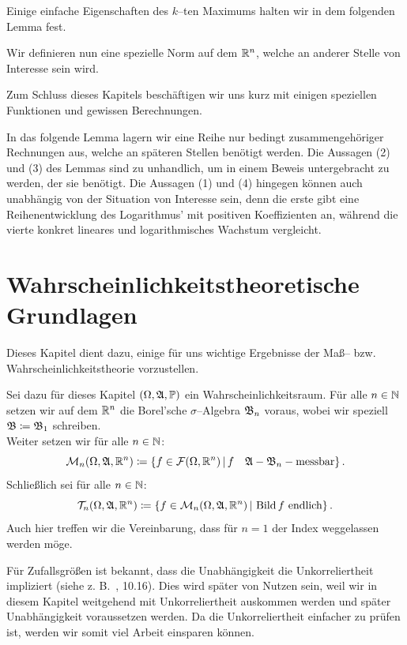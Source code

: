 \documentclass[a4paper]{report}
\numberwithin[\roman]{equation}{sat}
\begin{document}

\parag
Einige einfache Eigenschaften des $k$--ten Maximums halten wir in dem folgenden
Lemma fest.


\parag
Wir definieren nun eine spezielle Norm auf dem $\mathbb{R}^n$, welche an anderer Stelle
von Interesse sein wird.


\parag
Zum Schluss dieses Kapitels beschäftigen wir uns kurz mit einigen speziellen
Funktionen und gewissen Berechnungen.




\parag
In das folgende Lemma lagern wir eine Reihe nur bedingt zusammengehöriger
Rechnungen aus, welche an späteren Stellen benötigt werden. Die Aussagen (2)
und (3) des Lemmas sind zu unhandlich, um in einem Beweis untergebracht zu
werden, der sie benötigt. Die Aussagen (1) und (4) hingegen können auch
unabhängig von der Situation von Interesse sein, denn die erste gibt eine
Reihenentwicklung des Logarithmus' mit positiven Koeffizienten an, während die
vierte konkret lineares und logarithmisches Wachstum vergleicht.



\chapter{Wahrscheinlichkeitstheoretische Grundlagen}
\label{ch:kapitel2}

Dieses Kapitel dient dazu, einige für uns wichtige Ergebnisse der Maß-- bzw.
Wahrscheinlichkeitstheorie vorzustellen.

Sei dazu für dieses Kapitel $(\Omega, \mathfrak{A}, \mathbb{P})$
ein Wahrscheinlichkeitsraum. Für alle $n \in \mathbb{N}$ setzen wir auf dem $\mathbb{R}^n$
die Borel'sche $\sigma$--Algebra $\mathfrak{B}_n$ voraus, wobei wir speziell
$\mathfrak{B} \coloneqq  \mathfrak{B}_1$ schreiben.\\
Weiter setzen wir für alle $n \in \mathbb{N}$:
\[\mathcal{M}_n(\Omega, \mathfrak{A}, \mathbb{R}^n)
 \coloneqq \left\{f\in\mathcal{F}(\Omega,\mathbb{R}^n)\,|\,f\quad \mathfrak{A} - \mathfrak{B}_n - \text{messbar}\right\}\text.\]
Schließlich sei für alle $n \in \mathbb{N}$:
\[\mathcal{T}_n(\Omega, \mathfrak{A}, \mathbb{R}^n)
\coloneqq  \left\{f \in \mathcal{M}_n(\Omega, \mathfrak{A}, \mathbb{R}^n)\,|\,\mathop{\textrm{Bild}}\nolimits f \text{ endlich}\right\}\text.\]
Auch hier treffen wir die Vereinbarung, dass für $n = 1$ der Index weggelassen
werden möge.



Für Zufallsgrößen ist bekannt, dass die Unabhängigkeit die
Unkorreliertheit impliziert (siehe z. B.~\cite{Irle}, 10.16).
Dies wird später von Nutzen sein, weil wir in
diesem Kapitel weitgehend mit Unkorreliertheit auskommen werden und später
Unabhängigkeit voraussetzen werden. Da die Unkorreliertheit einfacher zu
prüfen ist, werden wir somit viel Arbeit einsparen können.
\end{document}
